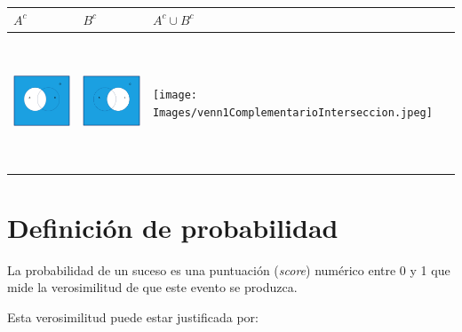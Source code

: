 \documentclass[
  letterpaper,
  DIV=11,
  numbers=noendperiod]{scrreprt}
\begin{document}
\begin{longtable}[]{@{}
  >{\centering\arraybackslash}p{}
  >{\centering\arraybackslash}p{}
  >{\centering\arraybackslash}p{}@{}}
\toprule\noalign{}
\begin{minipage}[b]{\linewidth}\centering
\(A^c\)
\end{minipage} & \begin{minipage}[b]{\linewidth}\centering
\(B^c\)
\end{minipage} & \begin{minipage}[b]{\linewidth}\centering
\(A^c\cup B^c\)
\end{minipage} \\
\midrule\noalign{}
\endhead
\bottomrule\noalign{}
\endlastfoot
\includegraphics[width=\linewidth,height=1.5625in,keepaspectratio]{Images/venn1Ac_conB.jpeg}
&
\includegraphics[width=\linewidth,height=1.5625in,keepaspectratio]{Images/venn1Bc_conA.jpeg}
&
\texttt{[image: Images/venn1ComplementarioInterseccion.jpeg]} \\
\end{longtable}

\section{Definición de
probabilidad}\label{definiciuxf3n-de-probabilidad}

La probabilidad de un suceso es una puntuación (\emph{score}) numérico
entre 0 y 1 que mide la verosimilitud de que este evento se produzca.

Esta verosimilitud puede estar justificada por:
\end{document}
